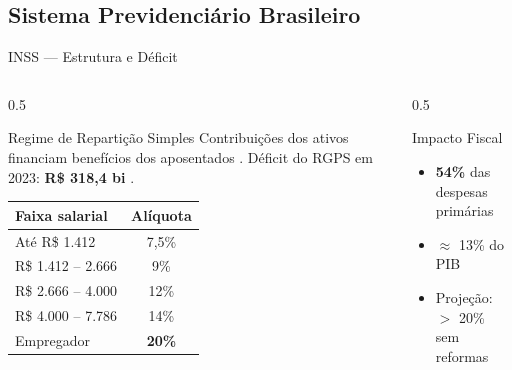 \documentclass{libs/ufc_format}
\begin{document}
\subsection{Sistema Previdenciário Brasileiro}
\begin{frame}{INSS --- Estrutura e Déficit}
    \begin{columns}
        \begin{column}{0.5\textwidth}
            \begin{block}{Regime de Repartição Simples}
                Contribuições dos ativos financiam benefícios dos aposentados \cite{gentil2006}.
                Déficit do RGPS em 2023: \textbf{R\$ 318,4 bi} \cite{tesouro2024}.
            \end{block}
            \vspace{0.2cm}
            \small
            \begin{tabular}{lc}
                \toprule
                \textbf{Faixa salarial} & \textbf{Alíquota} \\
                \midrule
                Até R\$ 1.412 & 7,5\% \\
                R\$ 1.412 -- 2.666 & 9\% \\
                R\$ 2.666 -- 4.000 & 12\% \\
                R\$ 4.000 -- 7.786 & 14\% \\
                \midrule
                Empregador & \textbf{20\%} \\
                \bottomrule
            \end{tabular}
        \end{column}
        \begin{column}{0.5\textwidth}
            \begin{alertblock}{Impacto Fiscal}
                \begin{itemize}
                    \item \textbf{54\%} das despesas primárias \cite{ifi2023}
                    \item $\approx$ 13\% do PIB
                    \item Projeção: $>$ 20\% sem reformas
                \end{itemize}
            \end{alertblock}
            \vspace{0.1cm}
        \end{column}
    \end{columns}
\end{frame}
\end{document}
